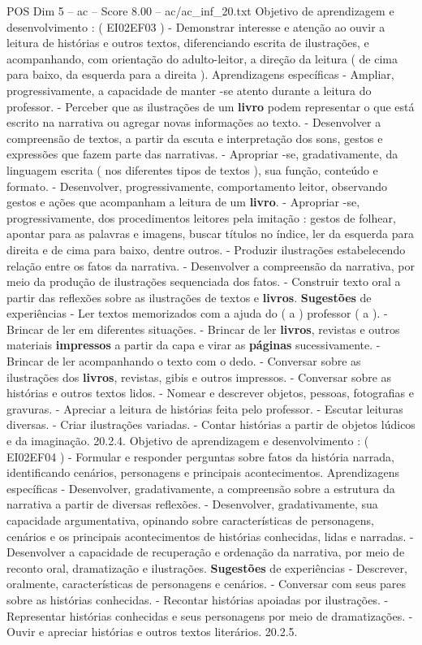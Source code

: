 \begin{textsample}{POS Dim 5 – ac – Score 8.00 – ac/ac\_inf\_20.txt}
Objetivo de aprendizagem e desenvolvimento : ( EI02EF03 ) - Demonstrar interesse e atenção ao ouvir a leitura de histórias e outros textos, diferenciando escrita de ilustrações, e acompanhando, com orientação do adulto-leitor, a direção da leitura ( de cima para baixo, da esquerda para a direita ).
Aprendizagens específicas - Ampliar, progressivamente, a capacidade de manter -se atento durante a leitura do professor. - Perceber que as ilustrações de um \textbf{livro} podem representar o que está escrito na narrativa ou agregar novas informações ao texto. - Desenvolver a compreensão de textos, a partir da escuta e interpretação dos sons, gestos e expressões que fazem parte das narrativas. - Apropriar -se, gradativamente, da linguagem escrita ( nos diferentes tipos de textos ), sua função, conteúdo e formato. - Desenvolver, progressivamente, comportamento leitor, observando gestos e ações que acompanham a leitura de um \textbf{livro}. - Apropriar -se, progressivamente, dos procedimentos leitores pela imitação : gestos de folhear, apontar para as palavras e imagens, buscar títulos no índice, ler da esquerda para direita e de cima para baixo, dentre outros. - Produzir ilustrações estabelecendo relação entre os fatos da narrativa. - Desenvolver a compreensão da narrativa, por meio da produção de ilustrações sequenciada dos fatos. - Construir texto oral a partir das reflexões sobre as ilustrações de textos e \textbf{livros}. \textbf{Sugestões} de experiências - Ler textos memorizados com a ajuda do ( a ) professor ( a ). - Brincar de ler em diferentes situações. - Brincar de ler \textbf{livros}, revistas e outros materiais \textbf{impressos} a partir da capa e virar as \textbf{páginas} sucessivamente. - Brincar de ler acompanhando o texto com o dedo. - Conversar sobre as ilustrações dos \textbf{livros}, revistas, gibis e outros impressos. - Conversar sobre as histórias e outros textos lidos. - Nomear e descrever objetos, pessoas, fotografias e gravuras. - Apreciar a leitura de histórias feita pelo professor. - Escutar leituras diversas. - Criar ilustrações variadas. - Contar histórias a partir de objetos lúdicos e da imaginação. 20.2.4.
Objetivo de aprendizagem e desenvolvimento : ( EI02EF04 ) - Formular e responder perguntas sobre fatos da história narrada, identificando cenários, personagens e principais acontecimentos.
Aprendizagens específicas - Desenvolver, gradativamente, a compreensão sobre a estrutura da narrativa a partir de diversas reflexões. - Desenvolver, gradativamente, sua capacidade argumentativa, opinando sobre características de personagens, cenários e os principais acontecimentos de histórias conhecidas, lidas e narradas. - Desenvolver a capacidade de recuperação e ordenação da narrativa, por meio de reconto oral, dramatização e ilustrações. \textbf{Sugestões} de experiências - Descrever, oralmente, características de personagens e cenários. - Conversar com seus pares sobre as histórias conhecidas. - Recontar histórias apoiadas por ilustrações. - Representar histórias conhecidas e seus personagens por meio de dramatizações. - Ouvir e apreciar histórias e outros textos literários. 20.2.5.

\end{textsample}
